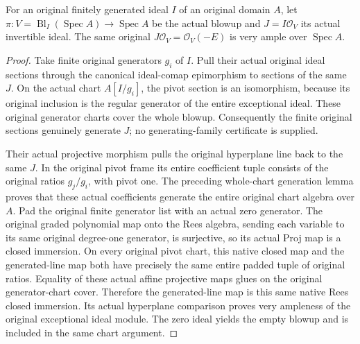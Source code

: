 \begin{lemma}
\label{lem:kn-nadel-nef-big-affine-rees-positive}
\notready
{}
For an original finitely generated ideal $I$ of an original domain $A$,
let $\pi:V=\operatorname{Bl}_I(\operatorname{Spec}A)\to\operatorname{Spec}A$
be the actual blowup and $J=I\mathcal O_V$ its actual invertible ideal.
The same original $J\mathcal O_V=\mathcal O_V(-E)$ is very ample over
$\operatorname{Spec}A$.
\end{lemma}
\begin{proof}
Take finite original generators $g_i$ of $I$. Pull their actual original
ideal sections through the canonical ideal-comap epimorphism to sections
of the same $J$. On the actual chart $A[I/g_i]$, the pivot section is an
isomorphism, because its original inclusion is the regular generator of
the entire exceptional ideal. These original generator charts cover the
whole blowup. Consequently the finite original sections genuinely generate
$J$; no generating-family certificate is supplied.

Their actual projective morphism pulls the original hyperplane line back
to the same $J$. In the original pivot frame its entire coefficient tuple
consists of the original ratios $g_j/g_i$, with pivot one. The preceding
whole-chart generation lemma proves that these actual coefficients
generate the entire original chart algebra over $A$. Pad the original finite generator list with an actual zero generator.
The original graded polynomial map onto the Rees algebra, sending each
variable to its same original degree-one generator, is surjective, so its
actual Proj map is a closed immersion. On every original pivot chart,
this native closed map and the generated-line map both have precisely
the same entire padded tuple of original ratios. Equality of these actual
affine projective maps glues on the original generator-chart cover.
Therefore the generated-line map is this same native Rees closed immersion.
Its actual hyperplane comparison proves very ampleness of the
original exceptional ideal module. The zero ideal yields the empty blowup
and is included in the same chart argument.
\end{proof}

